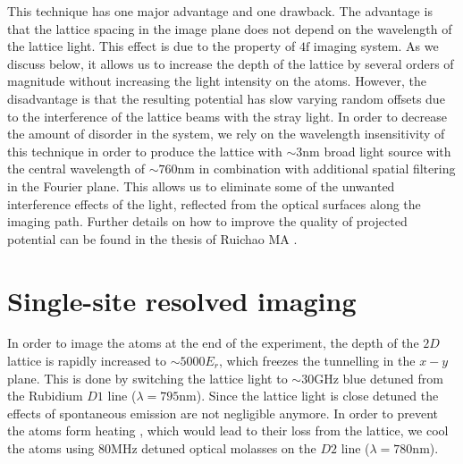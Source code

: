 This technique has one major advantage and one drawback. The advantage is that the lattice spacing in the image plane does not depend on the wavelength of the lattice light. This effect is due to the property of $4\mathrm{f}$ imaging system. As we discuss below, it allows us to increase the depth of the lattice by several orders of magnitude without increasing the light intensity on the atoms. However, the disadvantage is that the resulting potential has slow varying random offsets due to the interference of the lattice beams with the stray light. In order to decrease the amount of disorder in the system, we rely on the wavelength insensitivity of this technique in order to produce the lattice with $\sim 3\mathrm{nm}$ broad light source with the central wavelength of $\sim 760\mathrm{nm}$ in combination with additional spatial filtering in the Fourier plane. This allows us to eliminate some of the unwanted interference effects of the light, reflected from the optical surfaces along the imaging path. Further details on how to improve the quality of projected potential can be found in the thesis of Ruichao MA \cite{ma thesis}.

\section{Single-site resolved imaging}
In order to image the atoms at the end of the experiment, the depth of the $2D$ lattice is rapidly increased to $\sim 5000 E_r$, which freezes the tunnelling in the $x-y$ plane. This is done by switching the lattice light to $\sim 30\mathrm{GHz}$ blue detuned from the Rubidium $D1$ line ($\lambda = 795\mathrm{nm}$). Since the lattice light is close detuned the effects of spontaneous emission are not negligible anymore. In order to prevent the atoms form heating \cite{Phys. Rev. A 82, 013615 (2010),Phys. Rev. A 82, 063605 (2010)}, which would lead to their loss from the lattice, we cool the atoms using $80\mathrm{MHz}$ detuned optical molasses on the $D2$ line ($\lambda = 780\mathrm{nm}$). 


